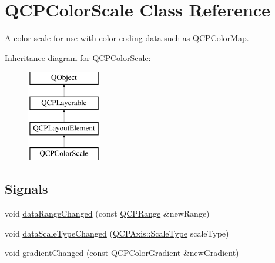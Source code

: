 \hypertarget{class_q_c_p_color_scale}{}\section{Q\+C\+P\+Color\+Scale Class Reference}
\label{class_q_c_p_color_scale}


A color scale for use with color coding data such as \mbox{\hyperlink{class_q_c_p_color_map}{Q\+C\+P\+Color\+Map}}.  


Inheritance diagram for Q\+C\+P\+Color\+Scale\+:\begin{figure}[H]
\begin{center}
\leavevmode
\includegraphics[height=4.000000cm]{class_q_c_p_color_scale}
\end{center}
\end{figure}
\subsection*{Signals}
\begin{DoxyCompactItemize}
\item 
void \mbox{\hyperlink{class_q_c_p_color_scale_a685717490a6aa83c5e711a4f34e837f9}{data\+Range\+Changed}} (const \mbox{\hyperlink{class_q_c_p_range}{Q\+C\+P\+Range}} \&new\+Range)
\item 
void \mbox{\hyperlink{class_q_c_p_color_scale_a61558b962f7791ff2f15a565dcf60181}{data\+Scale\+Type\+Changed}} (\mbox{\hyperlink{class_q_c_p_axis_a36d8e8658dbaa179bf2aeb973db2d6f0}{Q\+C\+P\+Axis\+::\+Scale\+Type}} scale\+Type)
\item 
void \mbox{\hyperlink{class_q_c_p_color_scale_a5e5f8c5626242c8f7308bfab74d3d989}{gradient\+Changed}} (const \mbox{\hyperlink{class_q_c_p_color_gradient}{Q\+C\+P\+Color\+Gradient}} \&new\+Gradient)
\end{DoxyCompactItemize}
